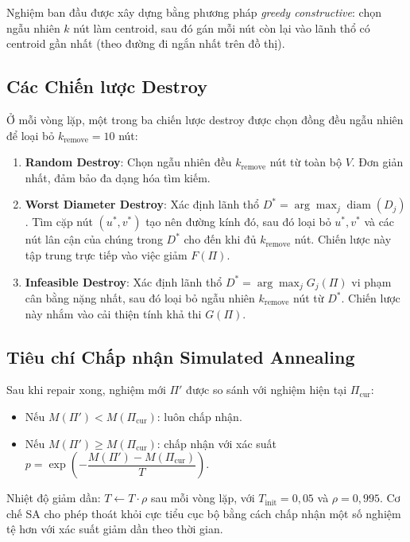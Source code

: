 \documentclass[12pt, a4paper]{article}
\begin{document}
Nghiệm ban đầu được xây dựng bằng phương pháp \emph{greedy constructive}:
chọn ngẫu nhiên $k$ nút làm centroid, sau đó gán mỗi nút còn lại vào lãnh thổ
có centroid gần nhất (theo đường đi ngắn nhất trên đồ thị).

\subsection{Các Chiến lược Destroy}

Ở mỗi vòng lặp, một trong ba chiến lược destroy được chọn đồng đều ngẫu nhiên
để loại bỏ $k_{\text{remove}} = 10$ nút:

\begin{enumerate}
  \item \textbf{Random Destroy}: Chọn ngẫu nhiên đều $k_{\text{remove}}$ nút
        từ toàn bộ $V$. Đơn giản nhất, đảm bảo đa dạng hóa tìm kiếm.

  \item \textbf{Worst Diameter Destroy}: Xác định lãnh thổ $D^* = \arg\max_j
        \operatorname{diam}(D_j)$. Tìm cặp nút $(u^*, v^*)$ tạo nên đường kính
        đó, sau đó loại bỏ $u^*, v^*$ và các nút lân cận của chúng trong $D^*$
        cho đến khi đủ $k_{\text{remove}}$ nút.
        Chiến lược này tập trung trực tiếp vào việc giảm $F(\Pi)$.

  \item \textbf{Infeasible Destroy}: Xác định lãnh thổ $D^* = \arg\max_j
        G_j(\Pi)$ vi phạm cân bằng nặng nhất, sau đó loại bỏ ngẫu nhiên
        $k_{\text{remove}}$ nút từ $D^*$. Chiến lược này nhắm vào cải thiện
        tính khả thi $G(\Pi)$.
\end{enumerate}

\subsection{Tiêu chí Chấp nhận Simulated Annealing}

Sau khi repair xong, nghiệm mới $\Pi'$ được so sánh với nghiệm hiện tại $\Pi_{\text{cur}}$:
\begin{itemize}
  \item Nếu $M(\Pi') < M(\Pi_{\text{cur}})$: luôn chấp nhận.
  \item Nếu $M(\Pi') \geq M(\Pi_{\text{cur}})$: chấp nhận với xác suất
        $p = \exp\!\left(-\dfrac{M(\Pi') - M(\Pi_{\text{cur}})}{T}\right)$.
\end{itemize}
Nhiệt độ giảm dần: $T \leftarrow T \cdot \rho$ sau mỗi vòng lặp, với
$T_{\text{init}} = 0{,}05$ và $\rho = 0{,}995$.
Cơ chế SA cho phép thoát khỏi cực tiểu cục bộ bằng cách chấp nhận một số nghiệm
tệ hơn với xác suất giảm dần theo thời gian.
\end{document}
